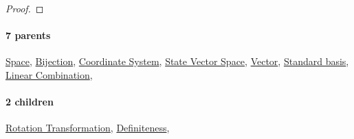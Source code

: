 \documentclass[../main.tex]{subfiles}
\begin{document}
{\par}
\begin{proof}
\proofbydefinition
\end{proof}\par
\paragraph{7 parents} \hyperref[statement:Space]{Space}, \hyperref[statement:Bijection]{Bijection}, \hyperref[statement:Coordinate System]{Coordinate System}, \hyperref[statement:State Vector Space]{State Vector Space}, \hyperref[statement:Vector]{Vector}, \hyperref[statement:Standard basis]{Standard basis}, \hyperref[statement:Linear Combination]{Linear Combination}, 
\paragraph{2 children} \hyperref[statement:Rotation Transformation]{Rotation Transformation}, \hyperref[statement:Definiteness]{Definiteness}, 
\end{document}
